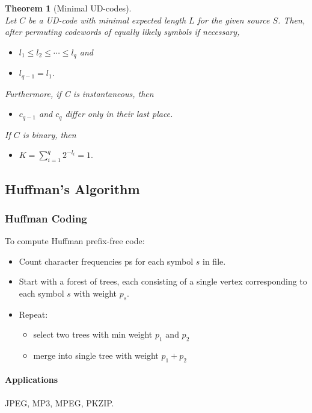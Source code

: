 \documentclass{article}
\newtheorem{theorem}{Theorem}[section]
\begin{document}
\begin{theorem}[Minimal UD-codes]
	\mbox{}\\
	Let $C$ be a UD-code with minimal expected length $L$ for the given source $S$. Then, after permuting codewords of equally likely symbols if necessary,
	\begin{itemize}
		\item $l_{1} \leq l_{2} \leq \cdots \leq l_{q}$ and
		\item $l_{q-1}=l_{1}$.
	\end{itemize}
	Furthermore, if C is instantaneous, then
	\begin{itemize}
		\item $c_{q-1}$ and $c_{q}$ differ only in their last place.
	\end{itemize}
	If $C$ is binary, then
	\begin{itemize}
		\item $K=\sum_{i=1}^{q}2^{-l_{i}}=1.$
	\end{itemize}
\end{theorem}

\subsection{Huffman's Algorithm}

\subsubsection{Huffman Coding}

To compute Huffman prefix-free code:

\begin{itemize}
	\item Count character frequencies ps for each symbol $s$ in file.
	\item Start with a forest of trees, each consisting of a single vertex corresponding to each symbol $s$ with weight $p_{s}$.
	\item Repeat:
		\begin{itemize}
			\item select two trees with min weight $p_{1}$ and $p_{2}$
			\item merge into single tree with weight $p_{1}+p_{2}$
		\end{itemize}
\end{itemize}

\paragraph{Applications} JPEG, MP3, MPEG, PKZIP.
\end{document}

